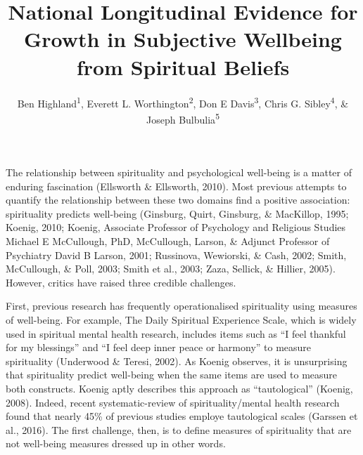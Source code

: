 \documentclass[
  english,
  man]{apa6}
\title{National Longitudinal Evidence for Growth in Subjective Wellbeing from Spiritual Beliefs}
\author{Ben Highland\textsuperscript{1}, Everett L. Worthington\textsuperscript{2}, Don E Davis\textsuperscript{3}, Chris G. Sibley\textsuperscript{4}, \& Joseph Bulbulia\textsuperscript{5}}
\date{}
\affiliation{\phantom{0}}
\begin{document}
\maketitle

The relationship between spirituality and psychological well-being is a matter of enduring fascination (Ellsworth \& Ellsworth, 2010). Most previous attempts to quantify the relationship between these two domains find a positive association: spirituality predicts well-being (Ginsburg, Quirt, Ginsburg, \& MacKillop, 1995; Koenig, 2010; Koenig, Associate Professor of Psychology and Religious Studies Michael E McCullough, PhD, McCullough, Larson, \& Adjunct Professor of Psychiatry David B Larson, 2001; Russinova, Wewiorski, \& Cash, 2002; Smith, McCullough, \& Poll, 2003; Smith et al., 2003; Zaza, Sellick, \& Hillier, 2005). However, critics have raised three credible challenges.

First, previous research has frequently operationalised spirituality using measures of well-being. For example, The Daily Spiritual Experience Scale, which is widely used in spiritual mental health research, includes items such as \enquote{I feel thankful for my blessings} and \enquote{I feel deep inner peace or harmony} to measure spirituality (Underwood \& Teresi, 2002). As Koenig observes, it is unsurprising that spirituality predict well-being when the same items are used to measure both constructs. Koenig aptly describes this approach as \enquote{tautological} (Koenig, 2008). Indeed, recent systematic-review of spirituality/mental health research found that nearly 45\% of previous studies employe tautological scales (Garssen et al., 2016). The first challenge, then, is to define measures of spirituality that are not well-being measures dressed up in other words.
\end{document}
